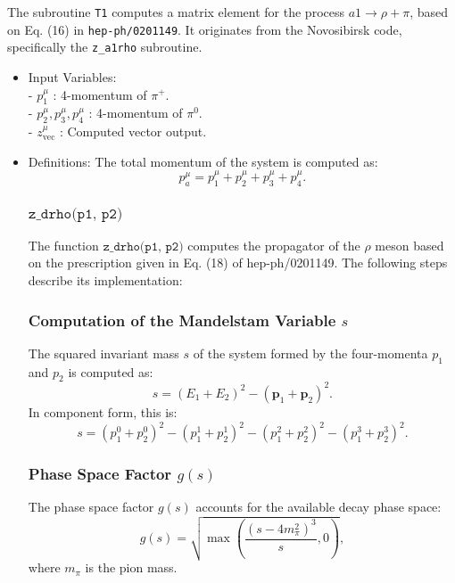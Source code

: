 \documentclass[12pt]{article}
\begin{document}
The subroutine \texttt{T1} computes a matrix element for the process \( a1 \to \rho + \pi  \), based on Eq. (16) in \texttt{hep-ph/0201149}. It originates from the Novosibirsk code, specifically the \texttt{z\_a1rho} subroutine.
\begin{itemize}

\item Input Variables:\\
- \( p_1^\mu \) : 4-momentum of \( \pi^+ \).\\
- \( p_2^\mu , p_3^\mu, p_4^\mu \) : 4-momentum of \( \pi^0 \).\\
- \( z_{\text{vec}}^\mu \) : Computed vector output.

\item Definitions:
The total momentum of the system is computed as:
\[
p_a^\mu = p_1^\mu + p_2^\mu + p_3^\mu + p_4^\mu.
\]

\subsubsection{$\texttt{z\_drho(p1, p2)}$}

The function $\texttt{z\_drho(p1, p2)}$ computes the propagator of the $\rho$ meson based on the prescription given in Eq. (18) of hep-ph/0201149. The following steps describe its implementation:

\subsubsection{Computation of the Mandelstam Variable \( s \)}

The squared invariant mass $s$ of the system formed by the four-momenta $p_1$ and $p_2$ is computed as:
\begin{equation}
s = (E_1 + E_2)^2 - (\mathbf{p}_1 + \mathbf{p}_2)^2.
\end{equation}
In component form, this is:
\begin{equation}
s = (p_1^0 + p_2^0)^2 - (p_1^1 + p_2^1)^2 - (p_1^2 + p_2^2)^2 - (p_1^3 + p_2^3)^2.
\end{equation}

\subsubsection{Phase Space Factor \( g(s) \)}

The phase space factor $g(s)$ accounts for the available decay phase space:
\begin{equation}
g(s) = \sqrt{\max \left( \frac{(s - 4 m_{\pi}^2)^3}{s}, 0 \right)},
\end{equation}
where $m_{\pi}$ is the pion mass.


\end{itemize}
\end{document}

